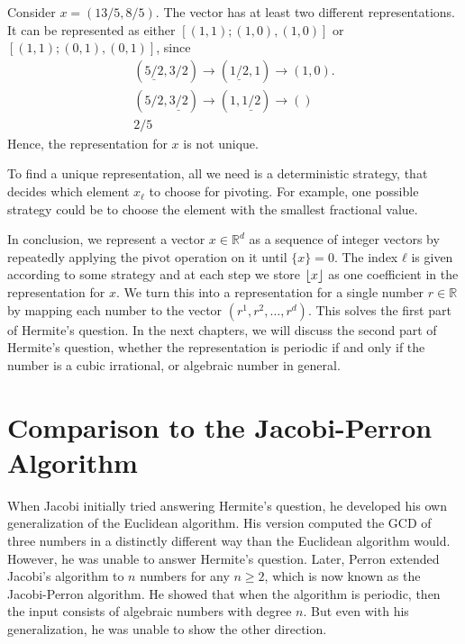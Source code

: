 \begin{example}
  Consider $x = (13/5, 8/5)$.
  The vector has at least two different representations.
  It can be represented as either $[(1,1); (1, 0), (1, 0)]$ or $[(1,1); (0, 1), (0, 1)]$,
  since
  \begin{align*}
    (\underline{5/2}, 3/2) → (\underline{1/2}, 1) → (1, 0). \\
    (5/2, \underline{3/2}) → (1, \underline{1/2}) → () \\
    2/5
  \end{align*}
  Hence, the representation for $x$ is not unique.
\end{example}

To find a unique representation, all we need is a deterministic strategy,
that decides which element $x_ℓ$ to choose for pivoting.
For example, one possible strategy could be to choose the element with the
smallest fractional value.

In conclusion,
we represent a vector $x ∈ ℝ^d$ as a sequence of integer vectors by repeatedly
applying the $\mathrm{pivot}$ operation on it until $\{x\} = 0$.
The index $ℓ$ is given according to some strategy and at each step we store
$\left\lfloor x\right\rfloor$ as one coefficient in the representation for $x$.
We turn this into a representation for a single number $r ∈ ℝ$ by mapping each
number to the vector $(r^1, r^2, …, r^d)$.
This solves the first part of Hermite's question.
In the next chapters, we will discuss the second part of Hermite's question,
whether the representation is periodic if and only if the number is a cubic
irrational, or algebraic number in general.

\iffalse
\section{Comparison to the Jacobi-Perron Algorithm}

When Jacobi \cite{Jacobi68} initially tried answering Hermite's question,
he developed his own generalization of the Euclidean algorithm.
His version computed the GCD of three numbers in a distinctly different way
than the Euclidean algorithm would.
However, he was unable to answer Hermite's question.
Later, Perron \cite{Perron07} extended Jacobi's algorithm to $n$ numbers for any $n ≥ 2$,
which is now known as the Jacobi-Perron algorithm.
He showed that when the algorithm is periodic, then the input consists of
algebraic numbers with degree $n$.
But even with his generalization, he was unable to show the other direction.

